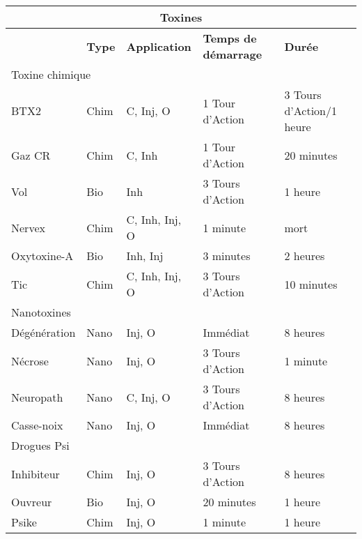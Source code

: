 \begin{table} 

\begin{tabular}{|l|l|l|l|l|} \hline

\multicolumn{5}{|c|}{\textbf{Toxines}} \\ \hline

&\textbf{Type}	&\textbf{Application}	&\textbf{Temps de démarrage}	&\textbf{Durée} \\ \hline

\multicolumn{5}{|l|}{Toxine chimique} \\ \hline

BTX2	&Chim	&C, Inj, O	&1 Tour d'Action	&3 Tours d'Action/1 heure \\ \hline

Gaz CR	&Chim	&C, Inh	&1 Tour d'Action	&20 minutes \\ \hline

Vol	&Bio	&Inh	&3 Tours d'Action	&1 heure \\ \hline

Nervex	&Chim	&C, Inh, Inj, O	&1 minute	&mort \\ \hline

Oxytoxine-A	&Bio	&Inh, Inj	&3 minutes	&2 heures \\ \hline

Tic	&Chim	&C, Inh, Inj, O	&3 Tours d'Action	&10 minutes \\ \hline

\multicolumn{5}{|l|}{Nanotoxines} \\ \hline

Dégénération	&Nano	&Inj, O	&Immédiat	&8 heures \\ \hline

Nécrose	&Nano	&Inj, O	&3 Tours d'Action	&1 minute \\ \hline

Neuropath	&Nano	&C, Inj, O	&3 Tours d'Action	&8 heures \\ \hline

Casse-noix	&Nano	&Inj, O	&Immédiat	&8 heures \\ \hline

\multicolumn{5}{|l|}{Drogues Psi} \\ \hline

Inhibiteur	&Chim	&Inj, O	&3 Tours d'Action	&8 heures \\ \hline

Ouvreur	&Bio	&Inj, O	&20 minutes	&1 heure \\ \hline

Psike	&Chim	&Inj, O	&1 minute	&1 heure \\ \hline

\end{tabular} \label{tab:Toxins} \end{table} 



